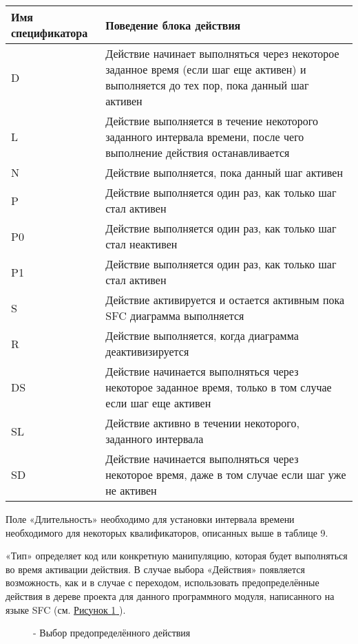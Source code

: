 \documentclass[letterpaper,10pt,russian]{sphinxmanual}
\begin{document}
\noindent\begin{tabulary}{\linewidth}{|L|L|}
\hline
\textsf{\relax 
Имя спецификатора
\unskip}\relax &\textsf{\relax 
Поведение блока действия
\unskip}\relax \\
\hline
D
&
Действие начинает выполняться
через некоторое заданное время
(если шаг еще активен) и
выполняется до тех пор, пока
данный шаг активен
\\
\hline
L
&
Действие выполняется в течение
некоторого заданного интервала
времени, после чего выполнение
действия останавливается
\\
\hline
N
&
Действие выполняется, пока данный
шаг активен
\\
\hline
P
&
Действие выполняется один раз,
как только шаг стал активен
\\
\hline
P0
&
Действие выполняется один раз,
как только шаг стал неактивен
\\
\hline
P1
&
Действие выполняется один раз,
как только шаг стал активен
\\
\hline
S
&
Действие активируется и остается
активным пока SFC диаграмма
выполняется
\\
\hline
R
&
Действие выполняется, когда
диаграмма деактивизируется
\\
\hline
DS
&
Действие начинается выполняться
через некоторое заданное время,
только в том случае если шаг еще
активен
\\
\hline
SL
&
Действие активно в течении
некоторого, заданного интервала
\\
\hline
SD
&
Действие начинается выполняться
через некоторое время, даже в том
случае если шаг уже не активен
\\
\hline\end{tabulary}


Поле «Длительность» необходимо для установки интервала времени
необходимого для некоторых квалификаторов, описанных выше в таблице 9.

«Тип» определяет код или конкретную манипуляцию, которая будет
выполняться во время активации действия. В случае выбора «Действия»
появляется возможность, как и в случае с переходом, использовать
предопределённые действия в дереве проекта для данного программного
модуля, написанного на языке SFC (см. \hyperref[usage_guide/ide_components:image101]{Рисунок \ref{usage_guide/ide_components:image101} }).
\begin{figure}[htbp]
\centering
\capstart

\noindent{}
\caption{- Выбор предопределённого действия}\label{usage_guide/ide_components:image101}\end{figure}
\end{document}
